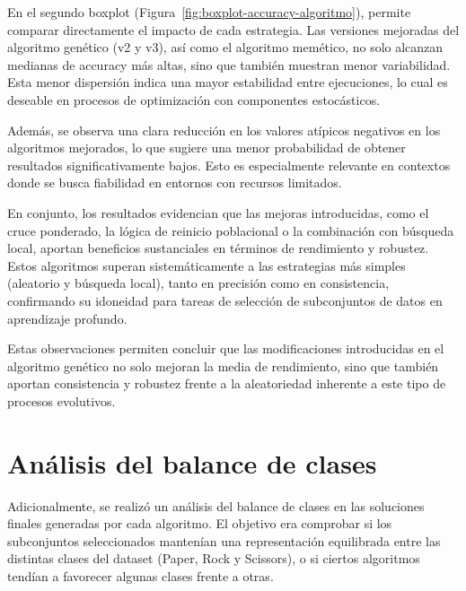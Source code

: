 En el segundo boxplot (Figura~\ref{fig:boxplot-accuracy-algoritmo}), permite comparar directamente el impacto de cada estrategia.
Las versiones mejoradas del algoritmo genético (v2 y v3), así como el algoritmo memético,
no solo alcanzan medianas de accuracy más altas, sino que también muestran menor variabilidad.
Esta menor dispersión indica una mayor estabilidad entre ejecuciones, lo cual es deseable en procesos
de optimización con componentes estocásticos.


Además, se observa una clara reducción en los valores atípicos negativos en los algoritmos mejorados, lo que sugiere una menor
probabilidad de obtener resultados significativamente bajos.
Esto es especialmente relevante en contextos donde se busca fiabilidad en entornos con recursos limitados.


En conjunto, los resultados evidencian que las mejoras introducidas, como el cruce ponderado, la lógica de reinicio poblacional
o la combinación con búsqueda local, aportan beneficios sustanciales en términos de rendimiento y robustez.
Estos algoritmos superan sistemáticamente a las estrategias más simples (aleatorio y búsqueda local), tanto en
precisión como en consistencia, confirmando su idoneidad para tareas de selección de subconjuntos de datos en aprendizaje profundo.


Estas observaciones permiten concluir que las modificaciones introducidas en el algoritmo genético no solo mejoran la media de rendimiento,
sino que también aportan consistencia y robustez frente a la aleatoriedad inherente a este tipo de procesos evolutivos.


\section{Análisis del balance de clases}\label{sec:analisis-del-balance-de-clases}
Adicionalmente, se realizó un análisis del balance de clases en las soluciones finales generadas por cada algoritmo.
El objetivo era comprobar si los subconjuntos seleccionados mantenían una representación equilibrada entre las
distintas clases del dataset (Paper, Rock y Scissors), o si ciertos algoritmos tendían a favorecer algunas clases frente a otras.


